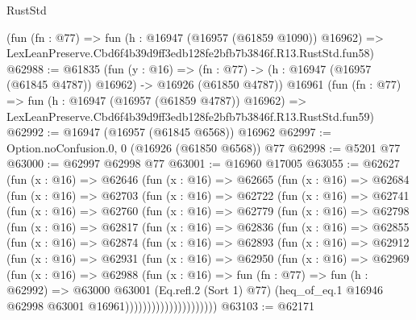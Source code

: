 \begin{lexlean}{RustStd}
\begin{coremodule}
    (fun (fn : @77) =>
    fun (h : @16947 (@16957 (@61859 @1090)) @16962) =>
    LexLeanPreserve.Cbd6f4b39d9ff3edb128fe2bfb7b3846f.R13.RustStd.fun58)
@62988 := @61835
    (fun (y : @16) =>
    (fn : @77) -> (h : @16947 (@16957 (@61845 @4787)) @16962) -> @16926 (@61850 @4787))
    @16961
    (fun (fn : @77) =>
    fun (h : @16947 (@16957 (@61859 @4787)) @16962) =>
    LexLeanPreserve.Cbd6f4b39d9ff3edb128fe2bfb7b3846f.R13.RustStd.fun59)
@62992 := @16947 (@16957 (@61845 @6568)) @16962
@62997 := Option.noConfusion.{0, 0} (@16926 (@61850 @6568)) @77
@62998 := @5201 @77
@63000 := @62997 @62998 @77
@63001 := @16960 @17005
@63055 := @62627
    (fun (x : @16) =>
    @62646
      (fun (x : @16) =>
      @62665
        (fun (x : @16) =>
        @62684
          (fun (x : @16) =>
          @62703
            (fun (x : @16) =>
            @62722
              (fun (x : @16) =>
              @62741
                (fun (x : @16) =>
                @62760
                  (fun (x : @16) =>
                  @62779
                    (fun (x : @16) =>
                    @62798
                      (fun (x : @16) =>
                      @62817
                        (fun (x : @16) =>
                        @62836
                          (fun (x : @16) =>
                          @62855
                            (fun (x : @16) =>
                            @62874
                              (fun (x : @16) =>
                              @62893
                                (fun (x : @16) =>
                                @62912
                                  (fun (x : @16) =>
                                  @62931
                                    (fun (x : @16) =>
                                    @62950
                                      (fun (x : @16) =>
                                      @62969
                                        (fun (x : @16) =>
                                        @62988
                                          (fun (x : @16) =>
                                          fun (fn : @77) =>
                                          fun (h : @62992) =>
                                          @63000
                                            @63001
                                            (Eq.refl.{2} (Sort 1) @77)
                                            (heq_of_eq.{1}
                                              @16946
                                              @62998
                                              @63001
                                              @16961)))))))))))))))))))))
@63103 := @62171

\end{coremodule}
\end{lexlean}
